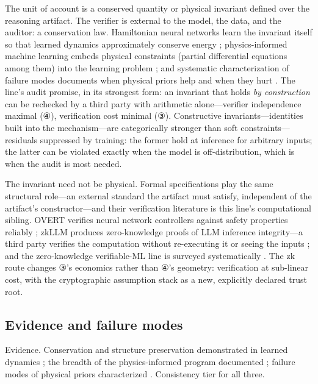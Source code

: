 \documentclass[11pt,a4paper]{article}
\begin{document}
The unit of account is a conserved quantity or physical invariant defined over the reasoning artifact. The verifier is external to the model, the data, and the auditor: a conservation law. Hamiltonian neural networks learn the invariant itself so that learned dynamics approximately conserve energy \cite{key11}; physics-informed machine learning embeds physical constraints (partial differential equations among them) into the learning problem \cite{key12}; and systematic characterization of failure modes documents when physical priors help and when they hurt \cite{key13}. The line's audit promise, in its strongest form: an invariant that holds \textit{by construction} can be rechecked by a third party with arithmetic alone—verifier independence maximal (④), verification cost minimal (③). Constructive invariants—identities built into the mechanism—are categorically stronger than soft constraints—residuals suppressed by training: the former hold at inference for arbitrary inputs; the latter can be violated exactly when the model is off-distribution, which is when the audit is most needed.

The invariant need not be physical. Formal specifications play the same structural role—an external standard the artifact must satisfy, independent of the artifact's constructor—and their verification literature is this line's computational sibling. OVERT verifies neural network controllers against safety properties reliably \cite{key52}; zkLLM produces zero-knowledge proofs of LLM inference integrity—a third party verifies the computation without re-executing it or seeing the inputs \cite{key53}; and the zero-knowledge verifiable-ML line is surveyed systematically \cite{key54}. The zk route changes ③'s economics rather than ④'s geometry: verification at sub-linear cost, with the cryptographic assumption stack as a new, explicitly declared trust root.

\subsection{Evidence and failure modes}

Evidence. Conservation and structure preservation demonstrated in learned dynamics \cite{key11}; the breadth of the physics-informed program documented \cite{key12}; failure modes of physical priors characterized \cite{key13}. Consistency tier for all three.
\end{document}
